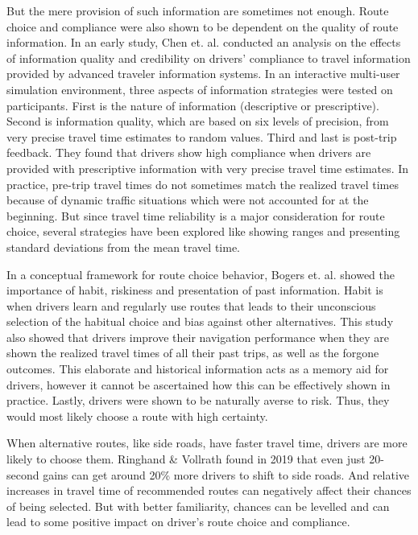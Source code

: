 But the mere provision of such information are sometimes not enough. Route choice and compliance were also shown to be dependent on the quality of route information\cite{Chorus2006TravelReview}. In an early study, Chen et. al. conducted an analysis on the effects of information quality and credibility on drivers' compliance to travel information provided by advanced traveler information systems\cite{chen1999effect}. In an interactive multi-user simulation environment, three aspects of information strategies were tested on participants. First is the nature of information (descriptive or prescriptive). Second is information quality, which are based on six levels of precision, from very precise travel time estimates to random values. Third and last is post-trip feedback. They found that drivers show high compliance when drivers are provided with prescriptive information with very precise travel time estimates. In practice, pre-trip travel times do not sometimes match the realized travel times because of dynamic traffic situations which were not accounted for at the beginning. But since travel time reliability is a major consideration for route choice\cite{lotan1997effects,carrion2012value}, several strategies have been explored like showing ranges \cite{tanaka2014experimental} and presenting standard deviations from the mean travel time\cite{bifulco2014evaluating}.

In a conceptual framework for route choice behavior, Bogers et. al. showed the importance of habit, riskiness and presentation of past information\cite{bogers2005joint}. Habit is when drivers learn and regularly use routes that leads to their unconscious selection of the habitual choice and bias against other alternatives. This study also showed that drivers improve their navigation performance when they are shown the realized travel times of all their past trips, as well as the forgone outcomes. This elaborate and historical information acts as a memory aid for drivers, however it cannot be ascertained how this can be effectively shown in practice. Lastly, drivers were shown to be naturally averse to risk. Thus, they would most likely choose a route with high certainty. 

When alternative routes, like side roads, have faster travel time, drivers are more likely to choose them. Ringhand \& Vollrath found in 2019 that even just 20-second gains can get around 20\% more drivers to shift to side roads\cite{ringhand2019effect}. And relative increases in travel time of recommended routes can negatively affect their chances of being selected\cite{abdel2004modeling,ardeshiri2015driving,ringhand2019effect}. But with better familiarity, chances can be levelled and can lead to some positive impact on driver's route choice and compliance\cite{adler2001investigating,bogers2005joint,shiftan2011route,ardeshiri2015driving}. 

